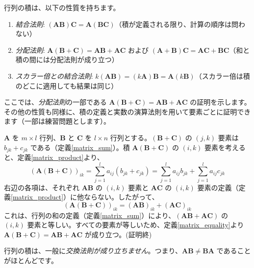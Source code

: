 \begin{thm}[行列の積の性質] \label{matrix_product_property}
行列の積は、以下の性質を持ちます。
\begin{enumerate}
\item \emph{結合法則}: $(\bm{A}\bm{B})\bm{C} = \bm{A}(\bm{B}\bm{C})$（積が定義される限り、計算の順序は問わない）
\item \emph{分配法則}: $\bm{A}(\bm{B} + \bm{C}) = \bm{A}\bm{B} + \bm{A}\bm{C}$ および $(\bm{A} + \bm{B})\bm{C} = \bm{A}\bm{C} + \bm{B}\bm{C}$（和と積の間には分配法則が成り立つ）
\item \emph{スカラー倍との結合法則}: $k(\bm{A}\bm{B}) = (k\bm{A})\bm{B} = \bm{A}(k\bm{B})$（スカラー倍は積のどこに適用しても結果は同じ）
\end{enumerate}
\begin{proof*}
ここでは、\emph{分配法則}の一部である $\bm{A}(\bm{B} + \bm{C}) = \bm{A}\bm{B} + \bm{A}\bm{C}$ の証明を示します。その他の性質も同様に、積の定義と実数の演算法則を用いて要素ごとに証明できます（一部は練習問題とします）。\par
$\bm{A}$ を $m \times l$ 行列、$\bm{B}$ と $\bm{C}$ を $l \times n$ 行列とする。$(\bm{B} + \bm{C})$ の $(j,k)$ 要素は $b_{jk} + c_{jk}$ である（定義\ref{matrix_sum}）。積 $\bm{A}(\bm{B} + \bm{C})$ の $(i,k)$ 要素を考えると、定義\ref{matrix_product}より、
\[(\bm{A}(\bm{B} + \bm{C}))_{ik} = \sum_{j=1}^{l} a_{ij}(b_{jk} + c_{jk})= \sum_{j=1}^{l} a_{ij}b_{jk} + \sum_{j=1}^{l} a_{ij}c_{jk}\]
右辺の各項は、それぞれ $\bm{A}\bm{B}$ の $(i,k)$ 要素と $\bm{A}\bm{C}$ の $(i,k)$ 要素の定義（定義\ref{matrix_product}）に他ならない。したがって、
\[(\bm{A}(\bm{B} + \bm{C}))_{ik} = (\bm{A}\bm{B})_{ik} + (\bm{A}\bm{C})_{ik}\]
これは、行列の和の定義（定義\ref{matrix_sum}）により、$(\bm{A}\bm{B} + \bm{A}\bm{C})$ の $(i,k)$ 要素と等しい。すべての要素が等しいため、定義\ref{matrix_equality}より $\bm{A}(\bm{B} + \bm{C}) = \bm{A}\bm{B} + \bm{A}\bm{C}$ が成り立つ。(証明終)
\end{proof*}
\end{thm}

\begin{rmk*}
行列の積は、一般に\emph{交換法則が成り立ちません}。つまり、$\bm{A}\bm{B} \neq \bm{B}\bm{A}$ であることがほとんどです。
\end{rmk*}

